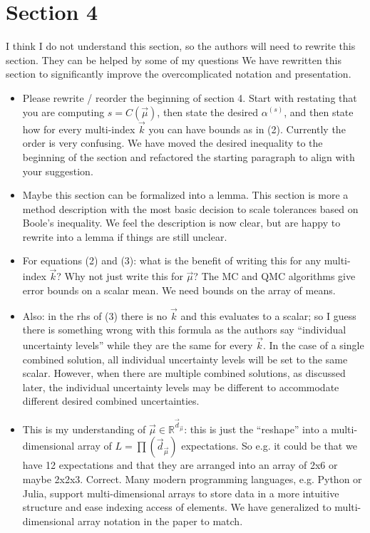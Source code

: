 \documentclass{article}[12pt]
\newcommand{\Referee}[1]{{\color{blue} #1 \newline}}
\begin{document}
\section*{Section 4}

\Referee{I think I do not understand this section, so the authors will need to rewrite this section. They can be helped by some of my questions}We have rewritten this section to significantly improve the overcomplicated notation and presentation. 

\begin{itemize}
    \item \Referee{Please rewrite / reorder the beginning of section 4. Start with restating that you are computing $s = C(\vec{\mu})$, then state the desired $\alpha^{(s)}$, and then state how for every multi-index $\vec{k}$ you can have bounds as in (2). Currently the order is very confusing.}We have moved the desired inequality to the beginning of the section and refactored the starting paragraph to align with your suggestion. 
    \item \Referee{Maybe this section can be formalized into a lemma.}This section is more a method description with the most basic decision to scale tolerances based on Boole's inequality. We feel the description is now clear, but are happy to rewrite into a lemma if things are still unclear.   
    \item \Referee{For equations (2) and (3): what is the benefit of writing this for any multi-index $\vec{k}$? Why not just write this for $\vec{\mu}$?}The MC and QMC algorithms give error bounds on a scalar mean. We need bounds on the array of means. 
    \item \Referee{Also: in the rhs of (3) there is no $\vec{k}$ and this evaluates to a scalar; so I guess there is something wrong with this formula as the authors say ``individual uncertainty levels'' while they are the same for every $\vec{k}$.}In the case of a single combined solution, all individual uncertainty levels will be set to the same scalar. However, when there are multiple combined solutions, as discussed later, the individual uncertainty levels may be different to accommodate different desired combined uncertainties.  
    \item \Referee{This is my understanding of $\vec{\mu} \in \mathbb{R}^{\vec{d}_{\vec{\mu}}}$: this is just the ``reshape'' into a multi-dimensional array of $L = \prod(\vec{d}_{\vec{\mu}})$ expectations. So e.g. it could be that we have 12 expectations and that they are arranged into an array of 2x6 or maybe 2x2x3.}Correct. Many modern programming languages, e.g. Python or Julia, support multi-dimensional arrays to store data in a more intuitive structure and ease indexing access of elements. We have generalized to multi-dimensional array notation in the paper to match. 

\end{itemize}
\end{document}
